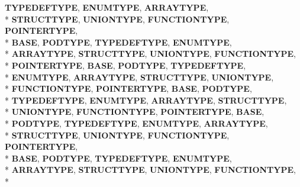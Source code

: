 \begin{DoxyCompactItemize}
{\bfseries T\-Y\-P\-E\-D\-E\-F\-T\-Y\-P\-E}, 
{\bfseries E\-N\-U\-M\-T\-Y\-P\-E}, 
{\bfseries A\-R\-R\-A\-Y\-T\-Y\-P\-E}, 
\\*
{\bfseries S\-T\-R\-U\-C\-T\-T\-Y\-P\-E}, 
{\bfseries U\-N\-I\-O\-N\-T\-Y\-P\-E}, 
{\bfseries F\-U\-N\-C\-T\-I\-O\-N\-T\-Y\-P\-E}, 
{\bfseries P\-O\-I\-N\-T\-E\-R\-T\-Y\-P\-E}, 
\\*
{\bfseries B\-A\-S\-E}, 
{\bfseries P\-O\-D\-T\-Y\-P\-E}, 
{\bfseries T\-Y\-P\-E\-D\-E\-F\-T\-Y\-P\-E}, 
{\bfseries E\-N\-U\-M\-T\-Y\-P\-E}, 
\\*
{\bfseries A\-R\-R\-A\-Y\-T\-Y\-P\-E}, 
{\bfseries S\-T\-R\-U\-C\-T\-T\-Y\-P\-E}, 
{\bfseries U\-N\-I\-O\-N\-T\-Y\-P\-E}, 
{\bfseries F\-U\-N\-C\-T\-I\-O\-N\-T\-Y\-P\-E}, 
\\*
{\bfseries P\-O\-I\-N\-T\-E\-R\-T\-Y\-P\-E}, 
{\bfseries B\-A\-S\-E}, 
{\bfseries P\-O\-D\-T\-Y\-P\-E}, 
{\bfseries T\-Y\-P\-E\-D\-E\-F\-T\-Y\-P\-E}, 
\\*
{\bfseries E\-N\-U\-M\-T\-Y\-P\-E}, 
{\bfseries A\-R\-R\-A\-Y\-T\-Y\-P\-E}, 
{\bfseries S\-T\-R\-U\-C\-T\-T\-Y\-P\-E}, 
{\bfseries U\-N\-I\-O\-N\-T\-Y\-P\-E}, 
\\*
{\bfseries F\-U\-N\-C\-T\-I\-O\-N\-T\-Y\-P\-E}, 
{\bfseries P\-O\-I\-N\-T\-E\-R\-T\-Y\-P\-E}, 
{\bfseries B\-A\-S\-E}, 
{\bfseries P\-O\-D\-T\-Y\-P\-E}, 
\\*
{\bfseries T\-Y\-P\-E\-D\-E\-F\-T\-Y\-P\-E}, 
{\bfseries E\-N\-U\-M\-T\-Y\-P\-E}, 
{\bfseries A\-R\-R\-A\-Y\-T\-Y\-P\-E}, 
{\bfseries S\-T\-R\-U\-C\-T\-T\-Y\-P\-E}, 
\\*
{\bfseries U\-N\-I\-O\-N\-T\-Y\-P\-E}, 
{\bfseries F\-U\-N\-C\-T\-I\-O\-N\-T\-Y\-P\-E}, 
{\bfseries P\-O\-I\-N\-T\-E\-R\-T\-Y\-P\-E}, 
{\bfseries B\-A\-S\-E}, 
\\*
{\bfseries P\-O\-D\-T\-Y\-P\-E}, 
{\bfseries T\-Y\-P\-E\-D\-E\-F\-T\-Y\-P\-E}, 
{\bfseries E\-N\-U\-M\-T\-Y\-P\-E}, 
{\bfseries A\-R\-R\-A\-Y\-T\-Y\-P\-E}, 
\\*
{\bfseries S\-T\-R\-U\-C\-T\-T\-Y\-P\-E}, 
{\bfseries U\-N\-I\-O\-N\-T\-Y\-P\-E}, 
{\bfseries F\-U\-N\-C\-T\-I\-O\-N\-T\-Y\-P\-E}, 
{\bfseries P\-O\-I\-N\-T\-E\-R\-T\-Y\-P\-E}, 
\\*
{\bfseries B\-A\-S\-E}, 
{\bfseries P\-O\-D\-T\-Y\-P\-E}, 
{\bfseries T\-Y\-P\-E\-D\-E\-F\-T\-Y\-P\-E}, 
{\bfseries E\-N\-U\-M\-T\-Y\-P\-E}, 
\\*
{\bfseries A\-R\-R\-A\-Y\-T\-Y\-P\-E}, 
{\bfseries S\-T\-R\-U\-C\-T\-T\-Y\-P\-E}, 
{\bfseries U\-N\-I\-O\-N\-T\-Y\-P\-E}, 
{\bfseries F\-U\-N\-C\-T\-I\-O\-N\-T\-Y\-P\-E}, 
\\*

\end{DoxyCompactItemize}
